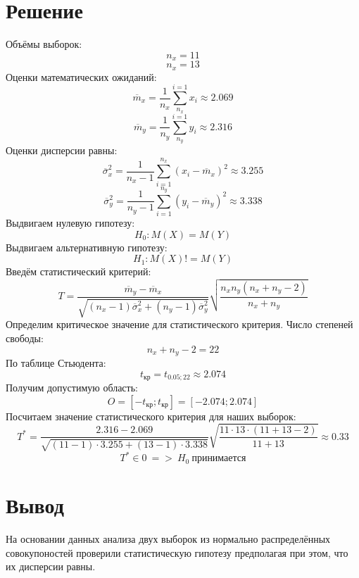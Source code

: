 \documentclass{article}
\begin{document}
\section{Решение}
Объёмы выборок:
\[n_x = 11\]
\[n_x = 13\]
Оценки математических ожиданий:
\[\overline{m}_x = \frac{1}{n_x}\sum_{n_x}^{i=1}x_i \approx 2.069\]
\[\overline{m}_y = \frac{1}{n_y}\sum_{n_y}^{i=1}y_i \approx 2.316\]
Оценки дисперсии равны:
\[\overline{\sigma}_x^2 = \frac{1}{n_x-1}\sum_{i=1}^{n_x}(x_i-\overline{m}_x)^2 \approx 3.255\]
\[\overline{\sigma}_y^2 = \frac{1}{n_y-1}\sum_{i=1}^{n_y}(y_i-\overline{m}_y)^2 \approx 3.338\]
Выдвигаем нулевую гипотезу:
\[H_0: M(X)=M(Y)\]
Выдвигаем альтернативную гипотезу:
\[H_1: M(X)!=M(Y)\]
Введём статистический критерий:
\[T = \frac{\overline{m}_y - \overline{m}_x}{\sqrt{(n_x-1)\overline{\sigma}_x^2 +(n_y-1)\overline{\sigma}_y^2 }}\sqrt{\frac{n_xn_y(n_x+n_y-2)}{n_x+n_y}}\]
Определим критическое значение для статистического критерия. 
Число степеней свободы: 
\[n_x+n_y-2=22\]
По таблице Стьюдента:
\[t_{\text{кр}} = t_{0.05; 22}\approx 2.074\]
Получим допустимую область:
\[O = [-t_{\text{кр}}; t_{\text{кр}}] = [-2.074; 2.074]\]
Посчитаем значение статистического критерия для наших выборок:
\[T^* = \frac{2.316 - 2.069}{\sqrt{(11-1)\cdot 3.255+(13-1)\cdot 3.338}}\sqrt{\frac{11\cdot 13\cdot (11+13-2)}{11+13}}\approx 0.33\]
\[T^*\in 0\ =>\ H_0 \ \text{принимается}\]

\section*{Вывод}
На основании данных анализа двух выборок из нормально распределённых совокупоностей проверили статистическую гипотезу предполагая при этом, что их дисперсии равны.
\end{document}
